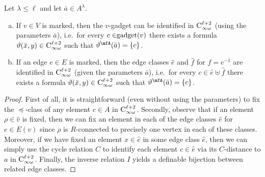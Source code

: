 \documentclass[a4paper,UKenglish]{lipics}
\newcommand{\logic}[1]{\ensuremath{\textsc{#1}}\xspace}
\newcommand{\INFCkx}[1]{\ensuremath{\logic{C}^{#1}_{\infty\omega}}\xspace}
\newcommand{\ba}{{\bar a}}
\newcommand{\bx}{{\bar x}}
\theoremstyle{plain}
\begin{document}
\begin{lemma}\label{lemma:marked:identified}
  Let $\lambda \leq \ell$ and let $\ba \in A^\lambda$.
\begin{enumerate}[(a)]
 \item If $v \in V$ is marked, then the $v$-gadget can be 
identified in $\INFCkx{\ell +2}$ (using the parameters $\ba$), i.e.\ 
 for every $c \in \gadget(v)$  there exists a formula 
 $\vartheta(\bx,y) \in \INFCkx{\ell +2}$ 
 such that $\vartheta^\mfA(\ba) = \{ c \}$.
 \item If an edge $e \in E$ is marked, then the edge classes $\hat e$ and 
$\hat f$ for $f = e^{-1}$ are 
identified in $\INFCkx{\ell +2}$ (given the parameters $\ba$), i.e.\ 
 for every $c \in \hat{e} \uplus \hat{f}$  there exists a formula 
 $\vartheta(\bx,y) \in \INFCkx{\ell +2}$ 
 such that $\vartheta^\mfA(\ba) = \{ c \}$.
\end{enumerate}
\end{lemma}
\begin{proof}
  First of all, it is straightforward (even without using the parameters) 
to fix the $\preceq$-class of any element $c \in A$ in $\INFCkx{\ell + 2}$.
  Secondly, observe that if an element $\rho \in \hat v$ is fixed, then 
we can fix an element in each of the edge classes $\hat e$ for $e \in 
E(v)$ since $\rho$ is $R$-connected to 
precisely one vertex in each of these classes. 
Moreover, if we have fixed an element $x \in \hat e$ in some edge class 
$\hat e$, then we can simply use the cycle relation $C$ to identify each 
element $c \in \hat e$ via its $C$-distance to $a$ in $\INFCkx{\ell + 
2}$.
Finally, the inverse relation $I$ yields a definable bijection between 
related edge classes. 
\end{proof}
\end{document}
